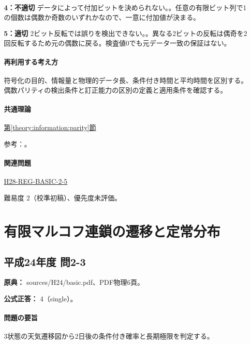\noindent\textbf{4：不適切} データによって付加ビットを決められない。。任意の有限ビット列で1の個数は偶数か奇数のいずれかなので、一意に付加値が決まる。\par

\noindent\textbf{5：適切} 2ビット反転では誤りを検出できない。。異なる2ビットの反転は偶奇を2回反転するため元の偶数に戻る。検査値0でも元データ一致の保証はない。\par

\paragraph{再利用する考え方} 符号化の目的、情報量と物理的データ長、条件付き時間と平均時間を区別する。偶数パリティの検出条件と訂正能力の区別の定義と適用条件を確認する。

\paragraph{共通理論} \hyperref[theory:information:parity]{第\ref*{theory:information:parity}節}

\par 参考：\cite{info_errors}。

\paragraph{関連問題} \hyperref[q:h28-reg-basic-2-5]{H28-REG-BASIC-2-5}

\par 難易度 2（校準初稿）、優先度未評価。

\section{有限マルコフ連鎖の遷移と定常分布}

\subsection{平成24年度 問2-3}
\label{q:h24-reg-basic-2-3}

\noindent\textbf{原典：} sources/H24/basic.pdf、PDF物理6頁。

\textbf{公式正答：} 4（single）。

\paragraph{問題の要旨} 3状態の天気遷移図から2日後の条件付き確率と長期極限を判定する。

